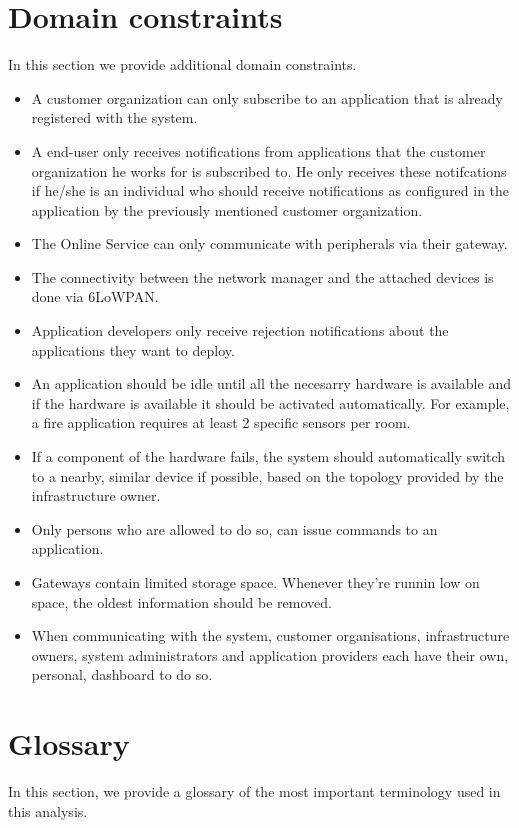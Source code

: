 \documentclass[english]{sareport}
\begin{document}
\section{Domain constraints}
In this section we provide additional domain constraints.

\begin{itemize}
    \item A customer organization can only subscribe to an application that is already registered with the system.
    \item A end-user only receives notifications from applications that the customer organization he works for is subscribed to. He only receives these notifcations if he/she is an individual who should receive notifications as configured in the application by the previously mentioned customer organization.
    \item The Online Service can only communicate with peripherals via their gateway.
    \item The connectivity between the network manager and the attached devices is done via 6LoWPAN.
    \item Application developers only receive rejection notifications about the applications they want to deploy.
    \item An application should be idle until all the necesarry hardware is available and if the hardware is available it should be activated automatically. For example, a fire application requires at least 2 specific sensors per room.
    \item If a component of the hardware fails, the system should automatically switch to a nearby, similar device if possible, based on the topology provided by the infrastructure owner.
    \item Only persons who are allowed to do so, can issue commands to an application.
    \item Gateways contain limited storage space. Whenever they're runnin low on space, the oldest information should be removed.
    \item When communicating with the system, customer organisations, infrastructure owners, system administrators and application providers each have their own, personal, dashboard to do so.
\end{itemize}

\section{Glossary}
In this section, we provide a glossary of the most important terminology used
in this analysis.
\end{document}
